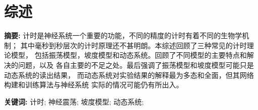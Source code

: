 \chapter{综述}

\begin{center}
\textbf{}
\end{center}

\bigskip
\noindent \textbf{摘要: \hspace{\Han}}
计时是神经系统一个重要的功能，不同的精度的计时有着不同的生物学机制；
其中毫秒到秒层次的计时原理还不甚明朗。本综述回顾了三种常见的计时理论模型，
包括振荡模型，坡度模型和动态系统。回顾了不同模型的主要特点和解决的问题，以及
各自主要的不足之处。最后强调了振荡模型和坡度模型可能只是动态系统的读出结果，
而动态系统对实验结果的解释最为多态和全面，但其网络构建和训练算法与神经系统
实际的情况可能仍有所出入。

\bigskip
\noindent \textbf{关键词: \hspace{\Han}}
计时;\;
神经震荡;\;
坡度模型;\;
动态系统;\;




%




%


